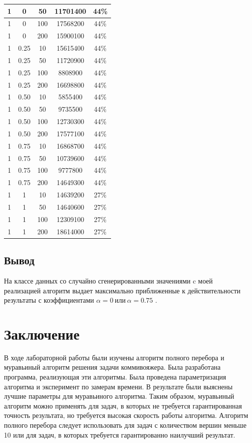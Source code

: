 \documentclass[a4paper,12pt]{report}
\begin{document}
\begin{longtable}{ | c | c | c | c | c | }
			1 & 0 & 50 & 11701400 & 44\% \\ \hline
			1 & 0 & 100 & 17568200 & 44\% \\ \hline
			1 & 0 & 200 & 15900100 & 44\% \\ \hline
			1 & 0.25 & 10 & 15615400 & 44\% \\ \hline
			1 & 0.25 & 50 & 11720900 & 44\% \\ \hline
			1 & 0.25 & 100 & 8808900 & 44\% \\ \hline
			1 & 0.25 & 200 & 16698800 & 44\% \\ \hline
			1 & 0.50 & 10 & 5855400 & 44\% \\ \hline
			1 & 0.50 & 50 & 9735500 & 44\% \\ \hline
			1 & 0.50 & 100 & 12730300 & 44\% \\ \hline
			1 & 0.50 & 200 & 17577100 & 44\% \\ \hline
			1 & 0.75 & 10 & 16868700 & 44\% \\ \hline
			1 & 0.75 & 50 & 10739600 & 44\% \\ \hline
			1 & 0.75 & 100 & 9777800 & 44\% \\ \hline
			1 & 0.75 & 200 & 14649300 & 44\% \\ \hline
			1 & 1 & 10 & 14639200 & 27\% \\ \hline
			1 & 1 & 50 & 14640600 & 27\% \\ \hline
			1 & 1 & 100 & 12309100 & 27\% \\ \hline
			1 & 1 & 200 & 18614000 & 27\% \\
		\end{longtable}
        
    \section{Вывод}

        	На классе данных со случайно сгенерированными значениями c моей реализацией алгоритм выдает максимально приближенные к действительности результаты с коэффициентами $\alpha = 0 \ \texttt{или} \ \alpha = 0.75$ .

    \newpage

    \chapter*{Заключение}
        \label{sec:conclusion_part}
        
		В ходе лабораторной работы были изучены алгоритм полного перебора и муравьиный алгоритм решения задачи коммивояжера. 
		Была разработана программа, реализующая эти алгоритмы. 
		Была проведена параметризация алгоритма и эксперимент по замерам времени. 
		В результате были выяснены лучшие параметры для муравьиного алгоритма.
		Таким образом, муравьиный алгоритм можно применять для задач, в которых не требуется гарантированная точность результата, но требуется высокая скорость работы алгоритма. 
		Алгоритм полного перебора следует использовать для задач с количеством вершин меньше 10 или для задач, в которых требуется гарантированно наилучший результат.
		
\end{document}
